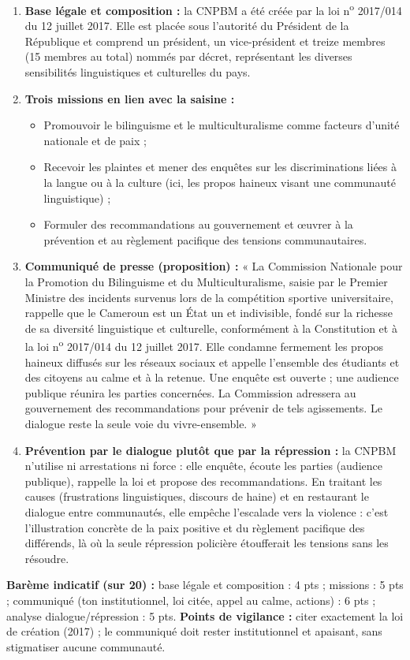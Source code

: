 \documentclass[11pt]{article}
\newcommand{\cle}[1]{{\popxbold\color{popdark}#1}}
\begin{document}
\begin{corrige}
\begin{enumerate}
\item \textbf{Base légale et composition :} la CNPBM a été créée par la \cle{loi n\textsuperscript{o} 2017/014 du 12 juillet 2017}. Elle est placée sous l'autorité du Président de la République et comprend un président, un vice-président et treize membres (15 membres au total) nommés par décret, représentant les diverses sensibilités linguistiques et culturelles du pays.
\item \textbf{Trois missions en lien avec la saisine :}
\begin{itemize}
\item Promouvoir le bilinguisme et le multiculturalisme comme facteurs d'unité nationale et de paix ;
\item Recevoir les plaintes et mener des enquêtes sur les discriminations liées à la langue ou à la culture (ici, les propos haineux visant une communauté linguistique) ;
\item Formuler des recommandations au gouvernement et œuvrer à la prévention et au règlement pacifique des tensions communautaires.
\end{itemize}
\item \textbf{Communiqué de presse (proposition) :} « La Commission Nationale pour la Promotion du Bilinguisme et du Multiculturalisme, saisie par le Premier Ministre des incidents survenus lors de la compétition sportive universitaire, rappelle que le Cameroun est un État un et indivisible, fondé sur la richesse de sa diversité linguistique et culturelle, conformément à la Constitution et à la loi n\textsuperscript{o} 2017/014 du 12 juillet 2017. Elle condamne fermement les propos haineux diffusés sur les réseaux sociaux et appelle l'ensemble des étudiants et des citoyens au calme et à la retenue. Une enquête est ouverte ; une audience publique réunira les parties concernées. La Commission adressera au gouvernement des recommandations pour prévenir de tels agissements. Le dialogue reste la seule voie du vivre-ensemble. »
\item \textbf{Prévention par le dialogue plutôt que par la répression :} la CNPBM n'utilise ni arrestations ni force : elle enquête, écoute les parties (audience publique), rappelle la loi et propose des recommandations. En traitant les causes (frustrations linguistiques, discours de haine) et en restaurant le dialogue entre communautés, elle empêche l'escalade vers la violence : c'est l'illustration concrète de la \cle{paix positive} et du règlement pacifique des différends, là où la seule répression policière étoufferait les tensions sans les résoudre.
\end{enumerate}
\textbf{Barème indicatif (sur 20) :} base légale et composition : 4 pts ; missions : 5 pts ; communiqué (ton institutionnel, loi citée, appel au calme, actions) : 6 pts ; analyse dialogue/répression : 5 pts.
\textbf{Points de vigilance :} citer exactement la loi de création (2017) ; le communiqué doit rester institutionnel et apaisant, sans stigmatiser aucune communauté.
\end{corrige}
\end{document}
